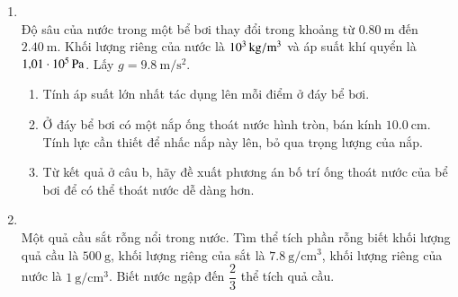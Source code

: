 \begin{enumerate}[label=\bfseries Bài \arabic*:,leftmargin=1.5cm]
\item{}\\
Độ sâu của nước trong một bể bơi thay đổi trong khoảng từ $\SI{0.80}{\meter}$ đến $\SI{2.40}{\meter}$. Khối lượng riêng của nước là $\SI{E3}{\kilogram/\meter^3}$ và áp suất khí quyển là $\SI{1.01E5}{\pascal}$. Lấy $g=\SI{9.8}{\meter/\second^2}$.
\begin{enumerate}[label=\alph*)]
	\item Tính áp suất lớn nhất tác dụng lên mỗi điểm ở đáy bể bơi.
	\item Ở đáy bể bơi có một nắp ống thoát nước hình tròn, bán kính $\SI{10.0}{\centi\meter}$. Tính lực cần thiết để nhấc nắp này lên, bỏ qua trọng lượng của nắp.
	\item Từ kết quả ở câu b, hãy đề xuất phương án bố trí ống thoát nước của bể bơi để có thể thoát nước dễ dàng hơn.
\end{enumerate}

\item {}\\
Một quả cầu sắt rỗng nổi trong nước. Tìm thể tích phần rỗng biết khối lượng quả cầu là $\SI{500}{\gram}$, khối lượng riêng của sắt là $\SI{7.8}{\gram/\centi\meter^3}$, khối lượng riêng của nước là $\SI{1}{\gram/\centi\meter^3}$. Biết nước ngập đến $\dfrac{2}{3}$ thể tích quả cầu.


\end{enumerate}
